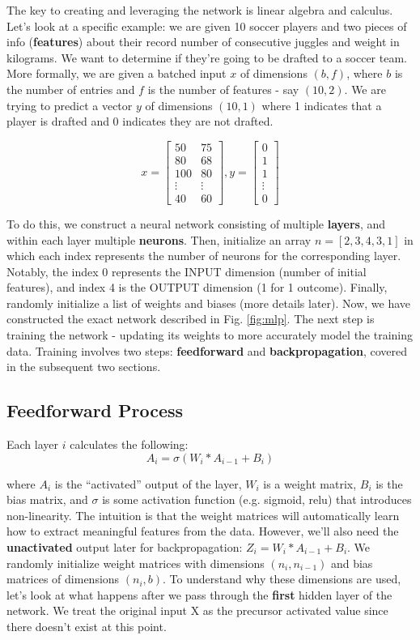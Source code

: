 \documentclass[12pt]{article}
\begin{document}
The key to creating and leveraging the network is linear algebra and calculus. Let's look at a specific example: we are given 10 soccer players and two pieces of info (\textbf{features}) about their record number of consecutive juggles and weight in kilograms. We want to determine if they're going to be drafted to a soccer team. More formally, we are given a batched input $x$ of dimensions $(b, f)$, where $b$ is the number of entries and $f$ is the number of features - say $(10, 2)$. We are trying to predict a vector $y$ of dimensions $(10, 1)$ where 1 indicates that a player is drafted and 0 indicates they are not drafted. 

\[x=\begin{bmatrix}
50 & 75 \\
80 & 68 \\
100 & 80 \\
\vdots & \vdots \\
40 & 60
\end{bmatrix}, y=\begin{bmatrix}
0 \\
1 \\
1 \\
\vdots \\
0
\end{bmatrix}\]

To do this, we construct a neural network consisting of multiple \textbf{layers}, and within each layer multiple \textbf{neurons}. Then, initialize an array $n = [2, 3, 4, 3, 1]$ in which each index represents the number of neurons for the corresponding layer. Notably, the index 0 represents the INPUT dimension (number of initial features), and index 4 is the OUTPUT dimension (1 for 1 outcome). Finally, randomly initialize a list of weights and biases (more details later). Now, we have constructed the exact network described in Fig. \ref{fig:mlp}. The next step is training the network - updating its weights to more accurately model the training data. Training involves two steps: \textbf{feedforward} and \textbf{backpropagation}, covered in the subsequent two sections.  


\subsection{Feedforward Process}

Each layer $i$ calculates the following:
\[A_i = \sigma(W_i * A_{i-1} + B_i)\]

where $A_i$ is the \enquote{activated} output of the layer, $W_i$ is a weight matrix, $B_i$ is the bias matrix, and $\sigma$ is some activation function (e.g. sigmoid, relu) that introduces non-linearity. The intuition is that the weight matrices will automatically learn how to extract meaningful features from the data. However, we'll also need the \textbf{unactivated} output later for backpropagation: $Z_i = W_i * A_{i-1} + B_i$. We randomly initialize weight matrices with dimensions $(n_{i}, n_{i-1})$ and bias matrices of dimensions $(n_{i}, b)$. To understand why these dimensions are used, let's look at what happens after we pass through the \textbf{first} hidden layer of the network. We treat the original input X as the precursor activated value since there doesn't exist at this point. 
\end{document}
